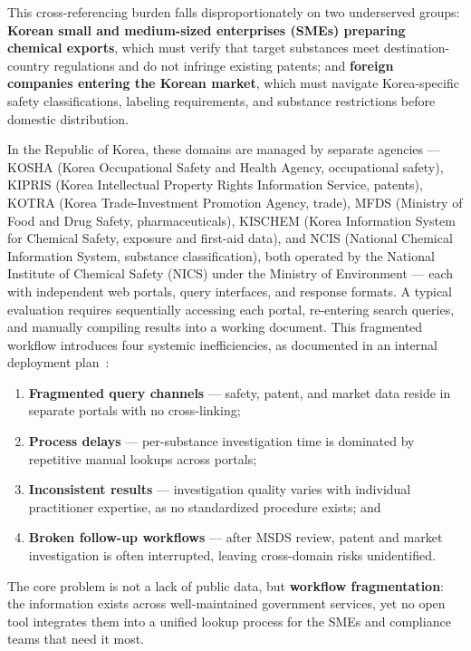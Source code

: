 \documentclass[preprint,12pt]{elsarticle}
\begin{document}
This cross-referencing burden falls disproportionately on two underserved groups: \textbf{Korean small and medium-sized enterprises (SMEs) preparing chemical exports}, which must verify that target substances meet destination-country regulations and do not infringe existing patents; and \textbf{foreign companies entering the Korean market}, which must navigate Korea-specific safety classifications, labeling requirements, and substance restrictions before domestic distribution.

In the Republic of Korea, these domains are managed by separate agencies --- KOSHA (Korea Occupational Safety and Health Agency, occupational safety), KIPRIS (Korea Intellectual Property Rights Information Service, patents), KOTRA (Korea Trade-Investment Promotion Agency, trade), MFDS (Ministry of Food and Drug Safety, pharmaceuticals), KISCHEM (Korea Information System for Chemical Safety, exposure and first-aid data), and NCIS (National Chemical Information System, substance classification), both operated by the National Institute of Chemical Safety (NICS) under the Ministry of Environment --- each with independent web portals, query interfaces, and response formats. A typical evaluation requires sequentially accessing each portal, re-entering search queries, and manually compiling results into a working document. This fragmented workflow introduces four systemic inefficiencies, as documented in an internal deployment plan~\cite{kim2026playbook}:

\begin{enumerate}
\item \textbf{Fragmented query channels} --- safety, patent, and market data reside in separate portals with no cross-linking;
\item \textbf{Process delays} --- per-substance investigation time is dominated by repetitive manual lookups across portals;
\item \textbf{Inconsistent results} --- investigation quality varies with individual practitioner expertise, as no standardized procedure exists; and
\item \textbf{Broken follow-up workflows} --- after MSDS review, patent and market investigation is often interrupted, leaving cross-domain risks unidentified.
\end{enumerate}

The core problem is not a lack of public data, but \textbf{workflow fragmentation}: the information exists across well-maintained government services, yet no open tool integrates them into a unified lookup process for the SMEs and compliance teams that need it most.
\end{document}
